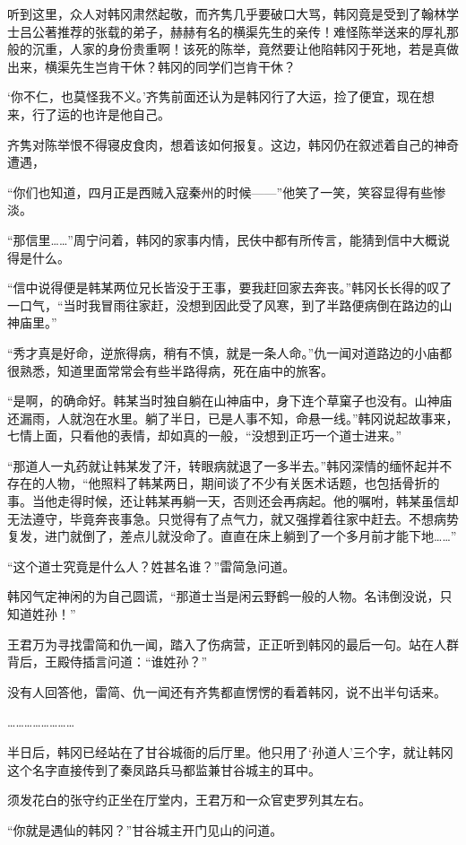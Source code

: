 听到这里，众人对韩冈肃然起敬，而齐隽几乎要破口大骂，韩冈竟是受到了翰林学士吕公著推荐的张载的弟子，赫赫有名的横渠先生的亲传！难怪陈举送来的厚礼那般的沉重，人家的身份贵重啊！该死的陈举，竟然要让他陷韩冈于死地，若是真做出来，横渠先生岂肯干休？韩冈的同学们岂肯干休？

‘你不仁，也莫怪我不义。’齐隽前面还认为是韩冈行了大运，捡了便宜，现在想来，行了运的也许是他自己。

齐隽对陈举恨不得寝皮食肉，想着该如何报复。这边，韩冈仍在叙述着自己的神奇遭遇，

“你们也知道，四月正是西贼入寇秦州的时候——”他笑了一笑，笑容显得有些惨淡。

“那信里……”周宁问着，韩冈的家事内情，民伕中都有所传言，能猜到信中大概说得是什么。

“信中说得便是韩某两位兄长皆没于王事，要我赶回家去奔丧。”韩冈长长得的叹了一口气，“当时我冒雨往家赶，没想到因此受了风寒，到了半路便病倒在路边的山神庙里。”

“秀才真是好命，逆旅得病，稍有不慎，就是一条人命。”仇一闻对道路边的小庙都很熟悉，知道里面常常会有些半路得病，死在庙中的旅客。

“是啊，的确命好。韩某当时独自躺在山神庙中，身下连个草窠子也没有。山神庙还漏雨，人就泡在水里。躺了半日，已是人事不知，命悬一线。”韩冈说起故事来，七情上面，只看他的表情，却如真的一般，“没想到正巧一个道士进来。”

“那道人一丸药就让韩某发了汗，转眼病就退了一多半去。”韩冈深情的缅怀起并不存在的人物，“他照料了韩某两日，期间谈了不少有关医术话题，也包括骨折的事。当他走得时候，还让韩某再躺一天，否则还会再病起。他的嘱咐，韩某虽信却无法遵守，毕竟奔丧事急。只觉得有了点气力，就又强撑着往家中赶去。不想病势复发，进门就倒了，差点儿就没命了。直直在床上躺到了一个多月前才能下地……”

“这个道士究竟是什么人？姓甚名谁？”雷简急问道。

韩冈气定神闲的为自己圆谎，“那道士当是闲云野鹤一般的人物。名讳倒没说，只知道姓孙！”

王君万为寻找雷简和仇一闻，踏入了伤病营，正正听到韩冈的最后一句。站在人群背后，王殿侍插言问道：“谁姓孙？”

没有人回答他，雷简、仇一闻还有齐隽都直愣愣的看着韩冈，说不出半句话来。

……………………

半日后，韩冈已经站在了甘谷城衙的后厅里。他只用了‘孙道人’三个字，就让韩冈这个名字直接传到了秦凤路兵马都监兼甘谷城主的耳中。

须发花白的张守约正坐在厅堂内，王君万和一众官吏罗列其左右。

“你就是遇仙的韩冈？”甘谷城主开门见山的问道。


